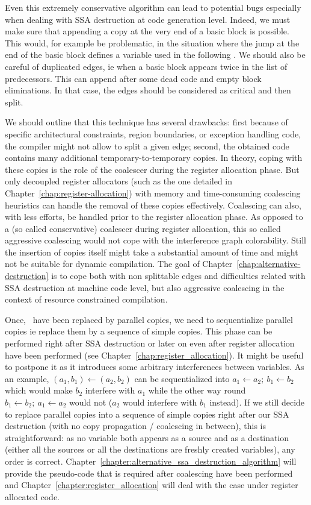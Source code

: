 Even this extremely conservative algorithm can lead to potential bugs especially when dealing with SSA destruction at code generation level. Indeed, we must make sure that appending a copy at the very end of a basic block is possible. This would, for example be problematic, in the situation where the jump at the end of the basic block defines a variable used in the following \phiop. We should also be careful of duplicated edges, ie when a basic block appears twice in the list of predecessors. This can append after some dead code and empty block eliminations. In that case, the edges should be considered as critical and then split.

We should outline that this technique has several drawbacks: first because of specific architectural constraints, region boundaries, or exception handling code, the compiler might not allow to split a given edge; second, the obtained code contains many additional temporary-to-temporary copies. In theory, coping with these copies is the role of the coalescer during the register allocation phase. But only decoupled register allocators (such as the one detailed in Chapter~\ref{chap:register-allocation}) with memory and time-consuming coalescing heuristics can handle the removal of these copies effectively. Coalescing can also, with less efforts, be handled prior to the register allocation phase. As opposed to a (so called conservative) coalescer during register allocation, this so called aggressive coalescing would not cope with the interference graph colorability. Still the insertion of copies itself might take a substantial amount of time and might not be suitable for dynamic compilation. The goal of Chapter~\ref{chap:alternative-destruction} is to cope both with non splittable edges and difficulties related with SSA destruction at machine code level, but also aggressive coalescing in the context of resource constrained compilation.

Once, \phiops\ have been replaced by parallel copies, we need to sequentialize parallel copies ie replace them by a sequence of simple copies. This phase can be performed right after SSA destruction or later on even after register allocation have been performed (see Chapter~\ref{chap:register_allocation}). It might be useful to postpone it as it introduces some arbitrary interferences between variables. As an example, $(a_1,b_1)\gets (a_2,b_2)$ can be sequentialized into $a_1\gets a_2;\ b_1\gets b_2$ which would make $b_2$ interfere with $a_1$ while the other way round $b_1\gets b_2;\ a_1\gets a_2$ would not ($a_2$ would interfere with $b_1$ instead).
If we still decide to replace parallel copies into a sequence of simple copies right after our SSA destruction (with no copy propagation / coalescing in between), this is straightforward: as no variable both appears as a source and as a destination (either all the sources or all the destinations are freshly created variables), any order is correct. Chapter~\ref{chapter:alternative_ssa_destruction_algorithm} will provide the pseudo-code that is required after coalescing have been performed and Chapter~\ref{chapter:register_allocation} will deal with the case under register allocated code.

